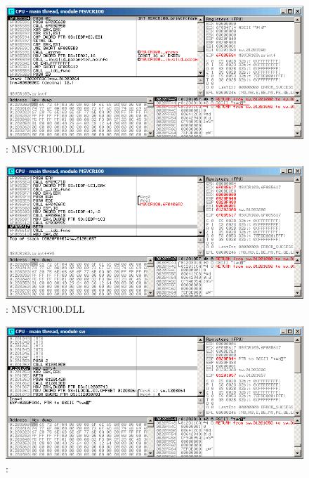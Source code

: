 \begin{figure}[H]
\centering
\includegraphics[scale=\FigScale]{patterns/08_switch/few_olly6.png}
\caption{\olly:  \printf \InENRU MSVCR100.DLL}
\label{fig:switch_few_olly6}
\end{figure}

\begin{figure}[H]
\centering
\includegraphics[scale=\FigScale]{patterns/08_switch/few_olly7.png}
\caption{\olly:  \printf \InENRU MSVCR100.DLL}
\label{fig:switch_few_olly7}
\end{figure}

\begin{figure}[H]
\centering
\includegraphics[scale=\FigScale]{patterns/08_switch/few_olly8.png}
\caption{\olly:  \main}
\label{fig:switch_few_olly8}
\end{figure}

